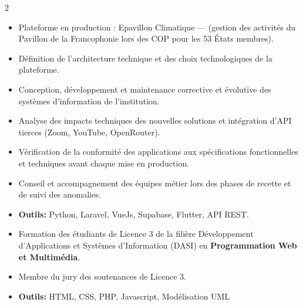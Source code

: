 \documentclass[10pt,a4paper,ragged2e,withhyper]{altacv}
\begin{document}
\begin{paracol}{2}
            \begin{itemize}
                \item Plateforme en production : Epavillon Climatique —  (gestion des activités du Pavillon de la Francophonie lors des COP pour les 53 États membres).
                \item Définition de l'architecture technique et des choix technologiques de la plateforme.
                \item Conception, développement et maintenance corrective et évolutive des systèmes d'information de l'institution.
                \item Analyse des impacts techniques des nouvelles solutions et intégration d'API tierces (Zoom, YouTube, OpenRouter).
                \item Vérification de la conformité des applications aux spécifications fonctionnelles et techniques avant chaque mise en production.
                \item Conseil et accompagnement des équipes métier lors des phases de recette et de suivi des anomalies.
                \item \textcolor{SecondaryColor}{\textbf{Outils: }} Python, Laravel, VueJs, Supabase, Flutter, API REST.
            \end{itemize}
            \divider

            \newpage

            \begin{itemize}
                \item Formation des étudiants de Licence 3 de la filière Développement d'Applications et Systèmes d'Information (DASI) en {\textbf{Programmation Web et Multimédia}}.
                \item Membre du jury des soutenances de Licence 3.
                \item \textcolor{SecondaryColor}{\textbf{Outils: }} HTML, CSS, PHP, Javascript, Modélisation UML
            \end{itemize}
            \divider


\end{paracol}
\end{document}
